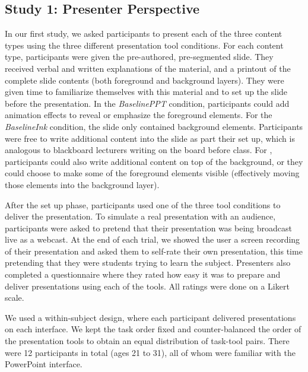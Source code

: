 \subsection{Study 1: Presenter Perspective}
In our first study, we asked participants to present each of the three content types using the three different presentation tool conditions. 
%
For each content type, participants were given the pre-authored, pre-segmented slide. 
They received verbal and written explanations of the material, and a printout of the complete slide contents (both foreground and background layers). They were given time to familiarize themselves with this material and to set up the slide before the presentation.
%
In the \textit{BaselinePPT} condition, participants could add animation effects to reveal or emphasize the foreground elements. For the \textit{BaselineInk} condition, the slide only contained background elements. Participants were free to write additional content into the slide as part their set up, which is analogous to blackboard lecturers writing on the board before class. For \interface, participants could also write additional content on top of the background, or they could choose to make some of the foreground elements visible (effectively moving those elements into the background layer).

After the set up phase, participants used one of the three tool conditions to deliver the presentation.
%
To simulate a real presentation with an audience, participants were asked to pretend that their presentation was being broadcast live as a webcast. At the end of each trial, we showed the user a screen recording of their presentation and asked them to self-rate their own presentation, this time pretending that they were students trying to learn the subject. Presenters also completed a questionnaire where they rated how easy it was to prepare and deliver presentations using each of the tools. All ratings were done on a  Likert scale.

We used a within-subject design, where each participant delivered presentations on each interface. We kept the task order fixed and counter-balanced the order of the presentation tools to obtain an equal distribution of task-tool pairs.
%
There were 12 participants in total (ages 21 to 31), all of whom were familiar with the PowerPoint interface. 

